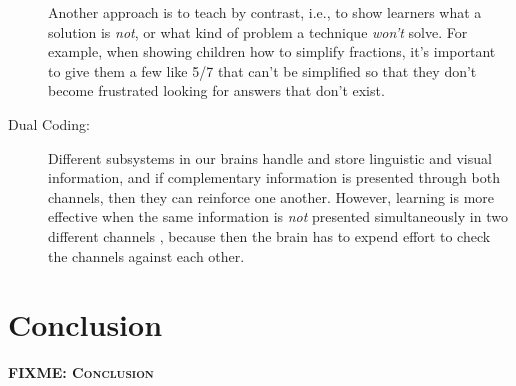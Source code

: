 \documentclass[10pt,letterpaper]{article}
\newcommand{\fixme}[1]{\textsc{\textbf{FIXME: {#1}}}}
\begin{document}
\begin{description}
  Another approach is to teach by contrast, i.e., to show learners what a
  solution is \emph{not}, or what kind of problem a technique \emph{won't}
  solve. For example, when showing children how to simplify fractions, it's
  important to give them a few like 5/7 that can't be simplified so that they
  don't become frustrated looking for answers that don't exist.

\item[Dual Coding:] Different subsystems in our brains handle and store
  linguistic and visual information, and if complementary information is
  presented through both channels, then they can reinforce one another. However,
  learning is more effective when the same information is \emph{not} presented
  simultaneously in two different channels \cite{Maye2003,Maye2009}, because then
  the brain has to expend effort to check the channels against each other.

\end{description}

\section*{Conclusion}

\fixme{Conclusion}


\end{document}
